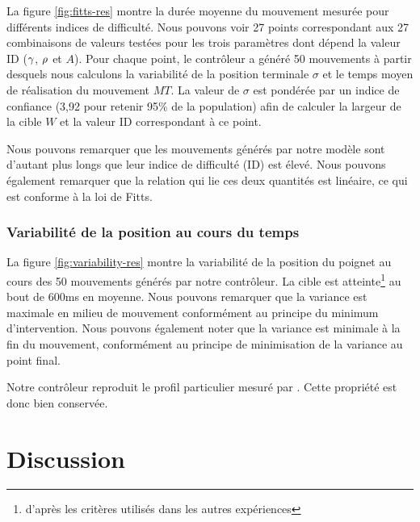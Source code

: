 \documentclass[pdftex,a4paper,11pt]{article}
\begin{document}
La figure \ref{fig:fitts-res} montre la durée moyenne du mouvement mesurée pour
différents indices de difficulté.
Nous pouvons voir 27 points correspondant aux 27 combinaisons de valeurs
testées pour les trois paramètres dont dépend la valeur ID ($\gamma$,
$\rho$ et $A$).  Pour chaque point, le contrôleur a généré 50
mouvements à partir desquels nous calculons la variabilité de la position
terminale $\sigma$ et le temps moyen de réalisation du mouvement $MT$.
La valeur de $\sigma$ est pondérée par un indice de confiance (3,92 pour
retenir 95\% de la population) afin de calculer la largeur de la cible $W$
et la valeur ID correspondant à ce point.

Nous pouvons remarquer que les mouvements générés par notre modèle sont d'autant
plus longs que leur indice de difficulté (ID) est élevé.
Nous pouvons également remarquer que la relation qui lie ces deux quantités est
linéaire, ce qui est conforme à la loi de Fitts. 


\subsubsection{Variabilité de la position au cours du temps}

La figure \ref{fig:variability-res} montre la variabilité de la position du
poignet au cours des 50 mouvements générés par notre contrôleur.  La cible est
atteinte\footnote{d'après les critères utilisés dans les autres expériences} au
bout de 600ms en moyenne.  Nous pouvons remarquer que la variance est maximale
en milieu de mouvement conformément au principe du minimum d'intervention.
Nous pouvons également noter que la variance est minimale à la fin du
mouvement, conformément au principe de minimisation de la variance au point
final.

Notre contrôleur reproduit le profil particulier mesuré par \cite{selen2006impedance}.
Cette propriété est donc bien conservée.


\section{Discussion}
\label{sec:discu}
\end{document}
